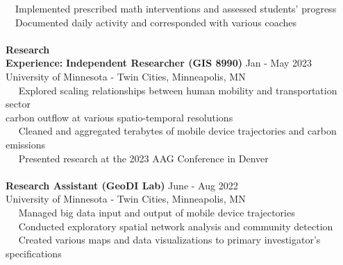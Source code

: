 \documentclass[letterpaper,12pt]{article}
\numberwithin{equation}{section}
\begin{document}
\hspace*{1.2in} \textbullet ~~Implemented prescribed math interventions and assessed students' progress\\
\hspace*{1.2in} \textbullet ~~Documented daily activity and corresponded with various coaches\\
\\
\noindent\textbf{Research}\\
\noindent\textbf{Experience:}\hspace*{.16in}\textbf{ Independent Researcher (GIS 8990)} \hspace*{2.2in} Jan - May 2023\\
\hspace*{1.16in} University of Minnesota - Twin Cities, Minneapolis, MN \vspace*{.1cm}\\
\hspace*{1.2in} \textbullet ~~ Explored scaling relationships between human mobility and transportation sector \\
\hspace*{1.6in} carbon outflow at various spatio-temporal resolutions\\
\hspace*{1.2in} \textbullet ~~ Cleaned and aggregated terabytes of mobile device trajectories and carbon emissions\\
\hspace*{1.2in} \textbullet ~~ Presented research at the 2023 AAG Conference in Denver
\\\\
\hspace*{1.16in} \textbf{Research Assistant (GeoDI Lab)} \hspace*{2.4in} June - Aug 2022\\
\hspace*{1.16in} University of Minnesota - Twin Cities, Minneapolis, MN \vspace*{.1cm}\\
\hspace*{1.2in} \textbullet ~~ Managed big data input and output of mobile device trajectories\\
\hspace*{1.2in} \textbullet ~~ Conducted exploratory spatial network analysis and community detection\\
\hspace*{1.2in} \textbullet ~~ Created various maps and data visualizations to primary investigator's specifications
\end{document}
